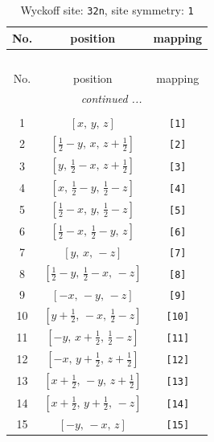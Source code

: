 \documentclass[fleqn,8pt]{jsarticle}
\begin{document}
\renewcommand{\arraystretch}{1.2}
\begin{longtable}{ccc}
\caption{Wyckoff site: {\tt 32n}, site symmetry: {\tt 1}}
 \\
 \hline \hline
No. & position & mapping \\ \hline \endfirsthead

\multicolumn{2}{l}{\tablename\ \thetable{}} \\
 \hline \hline
No. & position & mapping \\ \hline \endhead

 \hline \hline
\multicolumn{2}{r}{\footnotesize\it continued ...} \\ \endfoot

 \hline \hline
\multicolumn{2}{r}{} \\ \endlastfoot

1 & $\left[ x,\, y,\, z \right]$ & {\tt [1]} \\ \hline
2 & $\left[ \frac{1}{2} - y,\, x,\, z + \frac{1}{2} \right]$ & {\tt [2]} \\ \hline
3 & $\left[ y,\, \frac{1}{2} - x,\, z + \frac{1}{2} \right]$ & {\tt [3]} \\ \hline
4 & $\left[ x,\, \frac{1}{2} - y,\, \frac{1}{2} - z \right]$ & {\tt [4]} \\ \hline
5 & $\left[ \frac{1}{2} - x,\, y,\, \frac{1}{2} - z \right]$ & {\tt [5]} \\ \hline
6 & $\left[ \frac{1}{2} - x,\, \frac{1}{2} - y,\, z \right]$ & {\tt [6]} \\ \hline
7 & $\left[ y,\, x,\, - z \right]$ & {\tt [7]} \\ \hline
8 & $\left[ \frac{1}{2} - y,\, \frac{1}{2} - x,\, - z \right]$ & {\tt [8]} \\ \hline
9 & $\left[ - x,\, - y,\, - z \right]$ & {\tt [9]} \\ \hline
10 & $\left[ y + \frac{1}{2},\, - x,\, \frac{1}{2} - z \right]$ & {\tt [10]} \\ \hline
11 & $\left[ - y,\, x + \frac{1}{2},\, \frac{1}{2} - z \right]$ & {\tt [11]} \\ \hline
12 & $\left[ - x,\, y + \frac{1}{2},\, z + \frac{1}{2} \right]$ & {\tt [12]} \\ \hline
13 & $\left[ x + \frac{1}{2},\, - y,\, z + \frac{1}{2} \right]$ & {\tt [13]} \\ \hline
14 & $\left[ x + \frac{1}{2},\, y + \frac{1}{2},\, - z \right]$ & {\tt [14]} \\ \hline
15 & $\left[ - y,\, - x,\, z \right]$ & {\tt [15]} \\ \hline

\end{longtable}
\end{document}
